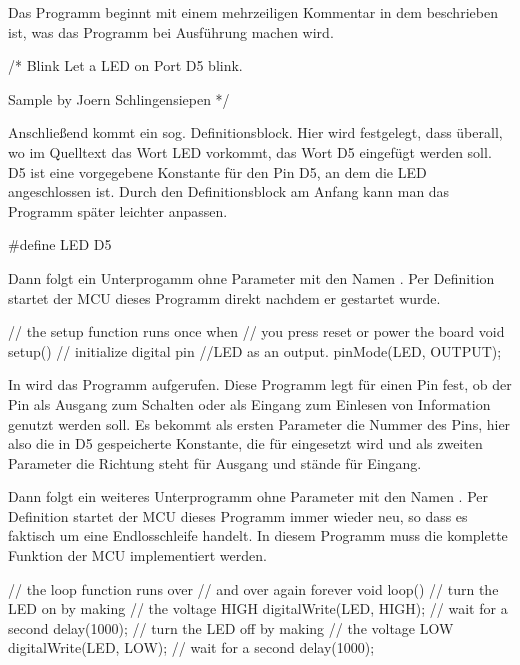 
Das Programm beginnt mit einem mehrzeiligen Kommentar in dem beschrieben ist, was das Programm bei Ausführung machen wird.

\begin{src}
/*
  Blink
  Let a LED on Port D5 blink.

  Sample by Joern Schlingensiepen
*/
\end{src}

Anschließend kommt ein sog. Definitionsblock. Hier wird festgelegt, dass überall, wo im Quelltext das Wort LED vorkommt,
das Wort D5 eingefügt werden soll. D5 ist eine vorgegebene Konstante für den Pin D5, an dem die LED angeschlossen ist. 
Durch den Definitionsblock am Anfang kann man das Programm später leichter anpassen.

\begin{src}
#define LED D5
\end{src}

Dann folgt ein Unterprogamm ohne Parameter mit den Namen . Per Definition startet der MCU dieses Programm
direkt nachdem er gestartet wurde.


\begin{src}
// the setup function runs once when 
// you press reset or power the board
void setup() {
  // initialize digital pin 
  //LED as an output.
  pinMode(LED, OUTPUT);
}
\end{src}

In  wird das Programm  aufgerufen. Diese Programm legt für einen Pin fest, ob der Pin als Ausgang
zum Schalten oder als Eingang zum Einlesen von Information genutzt werden soll. Es bekommt als ersten Parameter die Nummer des Pins,
hier also die in D5 gespeicherte Konstante, die für  eingesetzt wird und als zweiten Parameter die Richtung 
steht für Ausgang und  stände für Eingang.

Dann folgt ein weiteres Unterprogramm ohne Parameter mit den Namen . Per Definition startet der MCU dieses Programm
immer wieder neu, so dass es faktisch um eine Endlosschleife handelt. In diesem Programm muss die komplette Funktion der MCU 
implementiert werden.

\begin{src}
// the loop function runs over 
// and over again forever
void loop() {
  // turn the LED on by making 
  // the voltage HIGH
  digitalWrite(LED, HIGH);   
  // wait for a second
  delay(1000);               
  // turn the LED off by making 
  // the voltage LOW
  digitalWrite(LED, LOW);    
  // wait for a second
  delay(1000);               
}
\end{src}

